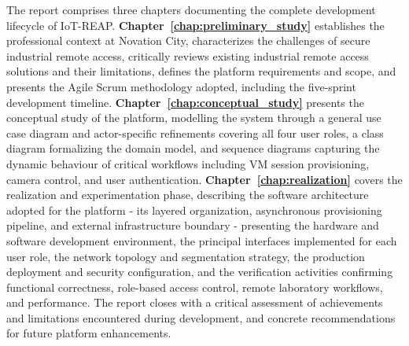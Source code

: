 The report comprises three chapters documenting the complete development
lifecycle of IoT-REAP. \textbf{Chapter~\ref{chap:preliminary_study}} establishes the professional context
at Novation City, characterizes the challenges of secure industrial remote
access, critically reviews existing industrial remote access solutions and their
limitations, defines the platform requirements and scope, and presents the Agile
Scrum methodology adopted, including the five-sprint development timeline.
\textbf{Chapter~\ref{chap:conceptual_study}} presents the conceptual study of the platform, modelling
the system through a general use case diagram and actor-specific refinements
covering all four user roles, a class diagram formalizing the domain model,
and sequence diagrams capturing the dynamic behaviour of critical workflows
including VM session provisioning, camera control, and user
authentication. \textbf{Chapter~\ref{chap:realization}} covers the realization and experimentation
phase, describing the software architecture adopted for the platform - its
layered organization, asynchronous provisioning pipeline, and external
infrastructure boundary - presenting the hardware and software development
environment, the principal interfaces implemented for each user role, the
network topology and segmentation strategy, the production deployment and
security configuration, and the verification activities confirming functional
correctness, role-based access control, remote laboratory workflows, and
performance. The report closes with a critical assessment of achievements and
limitations encountered during development, and concrete recommendations for
future platform enhancements.

\cleardoublepage